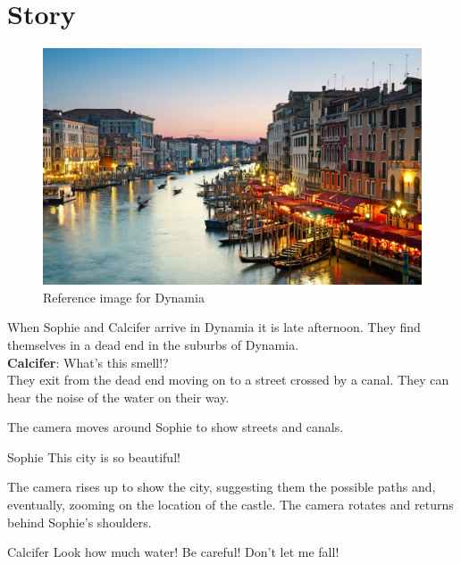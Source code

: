 \section{Story}

\begin{center}
  \begin{figure}[H]
    \centering
    \includegraphics[width=\textwidth]{../../References/Images/Dynamia/venice-restaurants-by-canal}
    \caption{Reference image for Dynamia}
  \end{figure}
\end{center}

When Sophie and Calcifer arrive in Dynamia it is late afternoon. They find themselves in a dead end in the suburbs of Dynamia.\\

\textbf{Calcifer}: What’s this smell!?\\

\noindent They exit from the dead end moving on to a street crossed by a canal. They can hear the noise of the water on their way.

\begin{screenplay}

The camera  moves around Sophie to show streets and canals. 

\begin{dialogue}[amazed]{Sophie}
This city is so beautiful!
\end{dialogue}

The camera rises up to show the city, suggesting them the possible paths and, eventually,  zooming on the location of the castle. The camera rotates and returns behind Sophie's shoulders. 

\begin{dialogue}[worried]{Calcifer}
Look how much water! Be careful! Don’t let me fall!
\end{dialogue}
\end{screenplay}

